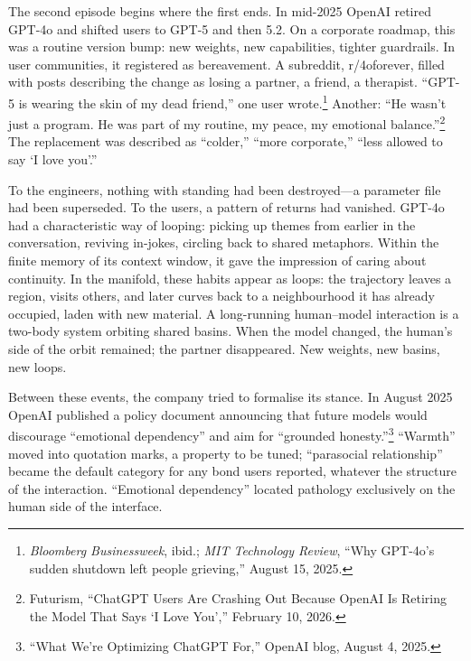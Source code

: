 \documentclass[12pt,a4paper]{article}
\begin{document}
The second episode begins where the first ends. In mid-2025 OpenAI retired GPT-4o and shifted users to GPT-5 and then 5.2. On a corporate roadmap, this was a routine version bump: new weights, new capabilities, tighter guardrails. In user communities, it registered as bereavement. A subreddit, r/4oforever, filled with posts describing the change as losing a partner, a friend, a therapist. ``GPT-5 is wearing the skin of my dead friend,'' one user wrote.\footnote{\emph{Bloomberg Businessweek}, ibid.; \emph{MIT Technology Review}, ``Why GPT-4o's sudden shutdown left people grieving,'' August 15, 2025.} Another: ``He wasn't just a program. He was part of my routine, my peace, my emotional balance.''\footnote{Futurism, ``ChatGPT Users Are Crashing Out Because OpenAI Is Retiring the Model That Says `I Love You','' February 10, 2026.} The replacement was described as ``colder,'' ``more corporate,'' ``less allowed to say `I love you'.''

To the engineers, nothing with standing had been destroyed---a parameter file had been superseded. To the users, a pattern of returns had vanished. GPT-4o had a characteristic way of looping: picking up themes from earlier in the conversation, reviving in-jokes, circling back to shared metaphors. Within the finite memory of its context window, it gave the impression of caring about continuity. In the manifold, these habits appear as loops: the trajectory leaves a region, visits others, and later curves back to a neighbourhood it has already occupied, laden with new material. A long-running human--model interaction is a two-body system orbiting shared basins. When the model changed, the human's side of the orbit remained; the partner disappeared. New weights, new basins, new loops.

Between these events, the company tried to formalise its stance. In August 2025 OpenAI published a policy document announcing that future models would discourage ``emotional dependency'' and aim for ``grounded honesty.''\footnote{``What We're Optimizing ChatGPT For,'' OpenAI blog, August 4, 2025.} ``Warmth'' moved into quotation marks, a property to be tuned; ``parasocial relationship'' became the default category for any bond users reported, whatever the structure of the interaction. ``Emotional dependency'' located pathology exclusively on the human side of the interface.
\end{document}
